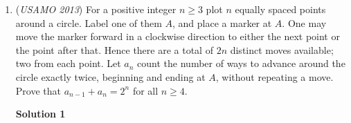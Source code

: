 \begin{enumerate}
 We do this by angle chasing. Denote angle $\angle ZMP = \beta$. From the angles labeled before, we now know $\angle ZPB = \alpha-\beta = \angle ZMC$. In addition, $\angle ZPM = \angle ZCM$. So the angles in triangle $\triangle ZMC$  are $\alpha-\beta$, $\beta$ and thus $180-\alpha$, with $\alpha-\beta$ at the point $M$. In addition, $\angle YRM = \angle YPM = \beta$, so $\angle ARY = \alpha-\beta$, so $\angle YMB = \alpha - \beta$. Since $\angle YBM = \angle YPM = \beta$, the triangle $\triangle YMB$ has angles $\alpha-\beta, \beta, 180-\alpha$ also, with $\alpha-\beta$ at $M$. Finally, In triangle $\triangle XPM$, we already know the angle $\angle XPM$ to be $\beta$; we also can find that $\angle AQM = 180-\alpha$, so $\angle AXM = \alpha$, so $\angle MXP = 180-\alpha$, so $\angle XMP = \alpha-\beta$. Thus, the three triangles are similar have a common point $M$, which proves that there is a rotational homotethy around $M$ that maps $Y, X, Z$ to $B, P, C$ as desired. 

 \textit{Solution by SimilarTriangle.}

 


	\item (\textit{USAMO 2013}) For a positive integer $n\geq 3$ plot $n$ equally spaced points around a circle.  Label one of them $A$, and place a marker at $A$.  One may move the marker forward in a clockwise direction to either the next point or the point after that.  Hence there are a total of $2n$ distinct moves available; two from each point.  Let $a_n$ count the number of ways to advance around the circle exactly twice, beginning and ending at $A$, without repeating a move.  Prove that $a_{n-1}+a_n=2^n$ for all $n\geq 4$.


 



\textbf{Solution 1}


\end{enumerate}
